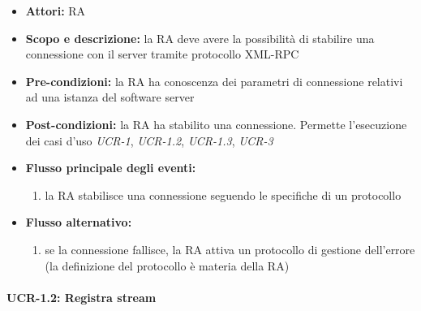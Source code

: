 \begin{itemize}
	\item \textbf{Attori:} RA
	\item \textbf{Scopo e descrizione:} la RA deve avere la possibilità di stabilire una connessione con il server tramite protocollo XML-RPC
	\item \textbf{Pre-condizioni:} la RA ha conoscenza dei parametri di connessione relativi ad una istanza del software server
	\item \textbf{Post-condizioni:} la RA ha stabilito una connessione. Permette l'esecuzione dei casi d'uso \emph{UCR-1}, \emph{UCR-1.2}, \emph{UCR-1.3}, \emph{UCR-3}
	\item \textbf{Flusso principale degli eventi:}
		\begin{enumerate}
			\item la RA stabilisce una connessione seguendo le specifiche di un protocollo
		\end{enumerate}
	\item \textbf{Flusso alternativo:}
		\begin{enumerate}
			\item se la connessione fallisce, la RA attiva un protocollo di gestione dell'errore (la definizione del protocollo è materia della RA)
		\end{enumerate}
\end{itemize}


\paragraph{UCR-1.2: Registra stream}

